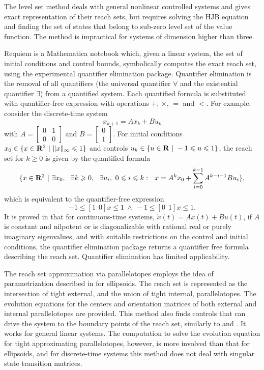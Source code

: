 \documentclass{report}
\begin{document}
The level set method \cite{mitchell,levelset} deals with general
nonlinear controlled systems and gives exact representation of
their reach sets, but requires solving the HJB equation and finding
the set of states that belong to sub-zero level set of the value function.
The method \cite{levelset} is impractical for systems of dimension higher
than three.

Requiem \cite{requiem} is a Mathematica notebook which, given a linear system,
the set of initial conditions and control bounds, symbolically computes
the exact reach set, using the experimental quantifier elimination package.
Quantifier elimination is the removal of all quantifiers (the universal
quantifier $\forall$ and the existential quantifier $\exists$) from a quantified
system. Each quantified formula is substituted with quantifier-free expression
with operations $+$, $\times$, $=$ and $<$. For example, consider the
discrete-time system
\[ x_{k+1} = Ax_k + Bu_k \]
with $A=\left[\begin{array}{cc}
0 & 1\\
0 & 0\end{array}\right]$ and $B=\left[\begin{array}{c}
0\\
1\end{array}\right]$.  For initial conditions
$x_0\in\{x\in {\bf R}^2 ~|~ \|x\|_{\infty} \leq 1\}$ and controls
$u_k\in\{u\in {\bf R} ~|~ -1\leq u\leq1\}$, the reach set for  $k\geq0$
is given by the quantified formula
\[\{ x\in{\bf R}^2 ~|~ \exists x_0, ~~ \exists k\geq 0, ~~
\exists u_i, ~ 0\leq i\leq k: ~~
x = A^kx_0+\sum_{i=0}^{k-1}A^{k-i-1}Bu_i \}, \]
which is equivalent to the quantifier-free expression
\[ -1\leq[1 ~~ 0]x\leq1 ~ \wedge ~ -1\leq[0 ~~ 1]x\leq1. \]
It is proved in \cite{yovine} that for continuous-time systems,
$\dot{x}(t) = Ax(t) + Bu(t)$, if $A$ is constant and nilpotent or
is diagonalizable with rational real or purely imaginary eigenvalues,
and with suitable restrictions on the control and initial conditions,
the quantifier elimination package returns a quantifier free formula
describing the reach set. Quantifier elimination has limited applicability.

The reach set approximation via parallelotopes \cite{kostousova} employs
the idea of parametrization described in \cite{kurvar} for ellipsoids.
The reach set is represented as the intersection of tight external,
and the union of tight internal, parallelotopes.
The evolution equations for the centers and
orientation matrices of both external and internal parallelotopes are
provided. This method also finds controls that can drive the system to
the boundary points of the reach set, similarly to \cite{varaiya}
and \cite{kurvar}. It works for general linear systems.  The
computation to solve the evolution equation for tight approximating
parallelotopes, however, is more involved than that for ellipsoids,
and for discrete-time systems this method does not deal with singular state
transition matrices.
\end{document}
